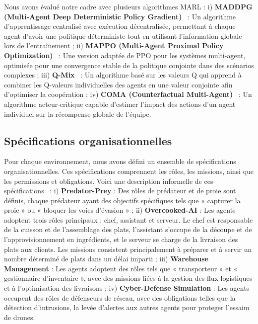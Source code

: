 \documentclass[francais,ROIA,Unicode,manuscript]{cedram}
\begin{document}
Nous avons évalué notre cadre avec plusieurs algorithmes MARL :
i) \textbf{MADDPG (Multi-Agent Deep Deterministic Policy Gradient)}~\cite{lowe2017multi} : Un algorithme d'apprentissage centralisé avec exécution décentralisée, permettant à chaque agent d'avoir une politique déterministe tout en utilisant l'information globale lors de l'entraînement
; \quad
ii) \textbf{MAPPO (Multi-Agent Proximal Policy Optimization)}~\cite{yu2021mappo} : Une version adaptée de PPO pour les systèmes multi-agent, optimisée pour une convergence stable de la politique conjointe dans des scénarios complexes
; \quad
iii) \textbf{Q-Mix}~\cite{rashid2018qmix} : Un algorithme basé sur les valeurs Q qui apprend à combiner les Q-valeurs individuelles des agents en une valeur conjointe afin d'optimiser la coopération
; \quad
iv) \textbf{COMA (Counterfactual Multi-Agent)}~\cite{foerster2018counterfactual} : Un algorithme acteur-critique capable d'estimer l'impact des actions d'un agent individuel sur la récompense globale de l'équipe.

\subsection{Spécifications organisationnelles}

Pour chaque environnement, nous avons défini un ensemble de spécifications organisationnelles. Ces spécifications comprennent les rôles, les missions, ainsi que les permissions et obligations. Voici une description informelle de ces spécifications~\hyperref[fn:github]{\footnotemark[2]} :
%
i) \textbf{Predator-Prey} : Des rôles de prédateur et de proie sont définis, chaque prédateur ayant des objectifs spécifiques tels que « capturer la proie » ou « bloquer les voies d'évasion »
; \quad
ii) \textbf{Overcooked-AI} : Les agents adoptent trois rôles principaux : chef, assistant et serveur. Le chef est responsable de la cuisson et de l'assemblage des plats, l'assistant s'occupe de la découpe et de l'approvisionnement en ingrédients, et le serveur se charge de la livraison des plats aux clients. Les missions consistent principalement à préparer et à servir un nombre déterminé de plats dans un délai imparti
; \quad
iii) \textbf{Warehouse Management} : Les agents adoptent des rôles tels que « transporteur » et « gestionnaire d'inventaire », avec des missions liées à la gestion des flux logistiques et à l'optimisation des livraisons
; \quad
iv) \textbf{Cyber-Defense Simulation} : Les agents occupent des rôles de défenseurs de réseau, avec des obligations telles que la détection d'intrusions, la levée d'alertes aux autres agents pour proteger l'essaim de drones.
\end{document}
